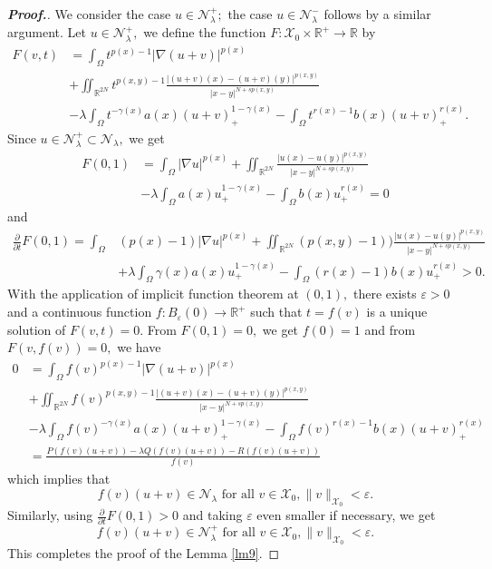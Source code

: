\documentclass[11pt]{article}
\newcommand{\R}{\mathbb{R}}
\newcommand{\X}{\mathcal{X}_{0}}
\newcommand{\Nh}{\mathcal{N}_\la}
\newcommand{\ve}{\varepsilon}
\newcommand{\pa} {\partial}
\newcommand{\ga} {\gamma}
\newcommand{\om} {\Omega}
\newcommand{\la} {\lambda}
\newcommand{\ra} {\rightarrow}
\newcommand{\grad}{\nabla}
\begin{document}
\begin{proof}[\bf Proof.]
    We consider the case $u\in \mathcal{N}_\la^+;$
the case $u\in \mathcal{N}_\la^-$
follows by a similar argument.
Let $u\in \mathcal{N}_\la^+,$
we define the function $F:\X\times\R^+\ra\R$
by
    \begin{align*}
        F(v,t) & =
\int_\om  t^{p(x)-1}|\grad (u+v)|^{p(x)}\\
&
+\iint_{\mathbb{R}^{2N}} t^{p(x,y)-1}
\frac{|(u+v)(x)-(u+v)(y)|^{p(x,y)}}{|x-y|^{N+sp(x,y)}}\\
        &-\la
\int_\om t^{-\ga(x)}a(x)(u+v)_+^{1-\ga(x)}
        -
\int_\om t^{r(x)-1}b(x)(u+v)_+^{r(x)}.
    \end{align*}
    Since $u\in \mathcal{N}_\la^+\subset\Nh,$
we get
    \begin{align*}
        F(0,1) & =
\int_\om|\grad u|^{p(x)}+\iint_{\mathbb{R}^{2N}}
\frac{|u(x)-u(y)|^{p(x,y)}}{|x-y|^{N+sp(x,y)}} \\
&
-\la
\int_\om a(x)u_+^{1-\ga(x)}
        -
\int_\om b(x)u_+^{r(x)}=0
    \end{align*}
    and 
    \begin{align*}
        \frac{\pa}{\pa t}F(0,1)=
\int_\om &(p(x)-1)|\grad u|^{p(x)}+
\iint_{\mathbb{R}^{2N}} (p(x,y)-1))
\frac{|u(x)-u(y)|^{p(x,y)}}{|x-y|^{N+sp(x,y)}}\\
        &+\la
\int_\om\ga(x) a(x)u_+^{1-\ga(x)}
        -
\int_\om (r(x)-1)b(x)u_+^{r(x)}>0.
    \end{align*}
With the application of implicit function 
theorem at $(0,1),$
there exists $\varepsilon>0$
and a continuous function 
$f:B_\varepsilon(0)\ra \R^+$
such that $t=f(v)$
is a unique solution of $F(v,t)=0.$
From $F(0,1)=0,$
we get $f(0)=1$
and from $F(v,f(v))=0,$
we have
  \begin{align*}
        0 & =
\int_\om 
 f(v)^{p(x)-1}|\grad (u+v)|^{p(x)} \\
 &
+\iint_{\mathbb{R}^{2N}} f(v)^{p(x,y)-1}
\frac{|(u+v)(x)-(u+v)(y)|^{p(x,y)}}{|x-y|^{N+sp(x,y)}}\\
&-\la
\int_\om f(v)^{-\ga(x)}a(x)(u+v)_+^{1-\ga(x)}
        -
\int_\om f(v)^{r(x)-1}b(x)(u+v)_+^{r(x)}\\
& =
\frac{P(f(v)(u+v))-\la Q(f(v)(u+v))-R(f(v)(u+v))}{f(v)}
    \end{align*}
    which implies that 
    $$f(v)(u+v)\in \Nh 
    \text{ for all }v\in \X, \|v\|_{\X}<\ve.$$
Similarly, using 
$\frac{\pa}{\pa t}F(0,1)>0$
and taking $\ve$
even smaller if necessary, we get
$$
f(v)(u+v)\in \Nh^+ \text{ for all }v\in \X, \|v\|_{\X}<\ve.
$$
    This completes the proof of the Lemma \ref{lm9}.
\end{proof}
\end{document}
